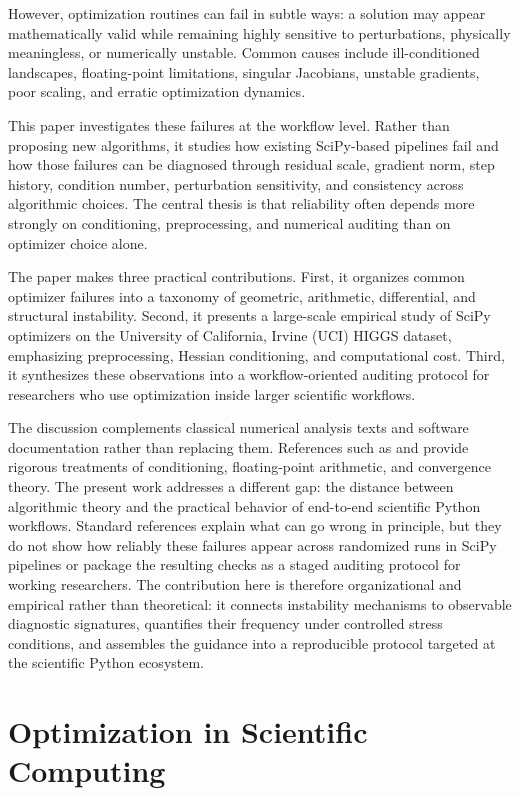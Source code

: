 However, optimization routines can fail in subtle ways: a solution may appear mathematically valid while remaining highly sensitive to perturbations, physically meaningless, or numerically unstable. Common causes include ill-conditioned landscapes, floating-point limitations, singular Jacobians, unstable gradients, poor scaling, and erratic optimization dynamics.

This paper investigates these failures at the workflow level. Rather than proposing new algorithms, it studies how existing SciPy-based pipelines fail and how those failures can be diagnosed through residual scale, gradient norm, step history, condition number, perturbation sensitivity, and consistency across algorithmic choices. The central thesis is that reliability often depends more strongly on conditioning, preprocessing, and numerical auditing than on optimizer choice alone.

The paper makes three practical contributions. First, it organizes common optimizer failures into a taxonomy of geometric, arithmetic, differential, and structural instability. Second, it presents a large-scale empirical study of SciPy optimizers on the University of California, Irvine (UCI) HIGGS dataset, emphasizing preprocessing, Hessian conditioning, and computational cost. Third, it synthesizes these observations into a workflow-oriented auditing protocol for researchers who use optimization inside larger scientific workflows.

The discussion complements classical numerical analysis texts and software documentation rather than replacing them. References such as \cite{nocedal} and \cite{higham} provide rigorous treatments of conditioning, floating-point arithmetic, and convergence theory. The present work addresses a different gap: the distance between algorithmic theory and the practical behavior of end-to-end scientific Python workflows. Standard references explain what can go wrong in principle, but they do not show how reliably these failures appear across randomized runs in SciPy pipelines or package the resulting checks as a staged auditing protocol for working researchers. The contribution here is therefore organizational and empirical rather than theoretical: it connects instability mechanisms to observable diagnostic signatures, quantifies their frequency under controlled stress conditions, and assembles the guidance into a reproducible protocol targeted at the scientific Python ecosystem.

\section{Optimization in Scientific Computing}

